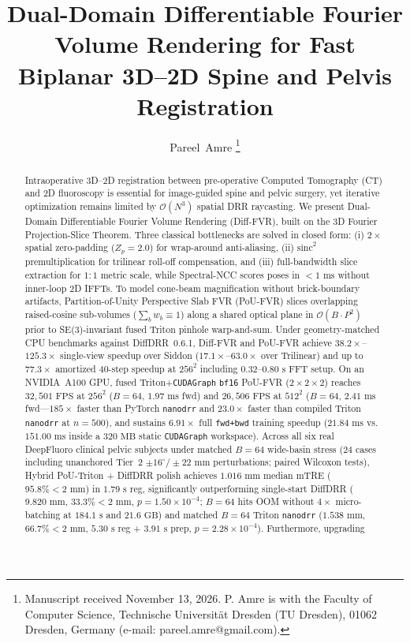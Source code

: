 \documentclass[journal]{IEEEtran}
\begin{document}
\title{Dual-Domain Differentiable Fourier Volume Rendering for Fast Biplanar 3D--2D Spine and Pelvis Registration}

\author{Pareel~Amre%
\thanks{Manuscript received November 13, 2026. P. Amre is with the Faculty of Computer Science, Technische Universit\"at Dresden (TU Dresden), 01062 Dresden, Germany (e-mail: pareel.amre@gmail.com).}%
}

\maketitle

\begin{abstract}
Intraoperative 3D--2D registration between pre-operative Computed Tomography (CT) and 2D fluoroscopy is essential for image-guided spine and pelvic surgery, yet iterative optimization remains limited by $\mathcal{O}(N^3)$ spatial DRR raycasting. We present Dual-Domain Differentiable Fourier Volume Rendering (Diff-FVR), built on the 3D Fourier Projection-Slice Theorem. Three classical bottlenecks are solved in closed form: (i) $2\times$ spatial zero-padding ($Z_p=2.0$) for wrap-around anti-aliasing, (ii) $\mathrm{sinc}^2$ premultiplication for trilinear roll-off compensation, and (iii) full-bandwidth slice extraction for $1:1$ metric scale, while Spectral-NCC scores poses in $<1\text{ ms}$ without inner-loop 2D IFFTs. To model cone-beam magnification without brick-boundary artifacts, Partition-of-Unity Perspective Slab FVR (PoU-FVR) slices overlapping raised-cosine sub-volumes ($\sum_b w_b \equiv 1$) along a shared optical plane in $\mathcal{O}(B \cdot P^2)$ prior to SE(3)-invariant fused Triton pinhole warp-and-sum. Under geometry-matched CPU benchmarks against DiffDRR~0.6.1, Diff-FVR and PoU-FVR achieve $38.2\times$--$125.3\times$ single-view speedup over Siddon ($17.1\times$--$63.0\times$ over Trilinear) and up to $77.3\times$ amortized 40-step speedup at $256^2$ including $0.32$--$0.80\text{ s}$ FFT setup. On an NVIDIA~A100 GPU, fused Triton+\texttt{CUDAGraph} \texttt{bf16} PoU-FVR ($2\times 2\times 2$) reaches $32{,}501\text{ FPS}$ at $256^2$ ($B{=}64$, $1.97\text{ ms}$ fwd) and $26{,}506\text{ FPS}$ at $512^2$ ($B{=}64$, $2.41\text{ ms}$ fwd---$185\times$ faster than PyTorch \texttt{nanodrr} and $23.0\times$ faster than compiled Triton \texttt{nanodrr} at $n{=}500$), and sustains $6.91\times$ full \texttt{fwd+bwd} training speedup ($21.84\text{ ms}$ vs.\ $151.00\text{ ms}$ inside a $320\text{ MB}$ static \texttt{CUDAGraph} workspace). Across all six real DeepFluoro clinical pelvic subjects under matched $B{=}64$ wide-basin stress ($24$ cases including unanchored Tier~2 $\pm 16^\circ/\pm 22\text{ mm}$ perturbations; paired Wilcoxon tests), Hybrid PoU-Triton + DiffDRR polish achieves $1.016\text{ mm}$ median mTRE ($95.8\% <2\text{ mm}$) in $1.79\text{ s}$ reg, significantly outperforming single-start DiffDRR ($9.820\text{ mm}$, $33.3\% <2\text{ mm}$, $p=1.50\times 10^{-4}$; $B{=}64$ hits OOM without $4\times$ micro-batching at $184.1\text{ s}$ and $21.6\text{ GB}$) and matched $B{=}64$ Triton \texttt{nanodrr} ($1.538\text{ mm}$, $66.7\% <2\text{ mm}$, $5.30\text{ s}$ reg + $3.91\text{ s}$ prep, $p=2.28\times 10^{-4}$). Furthermore, upgrading 
\end{abstract}
\end{document}

